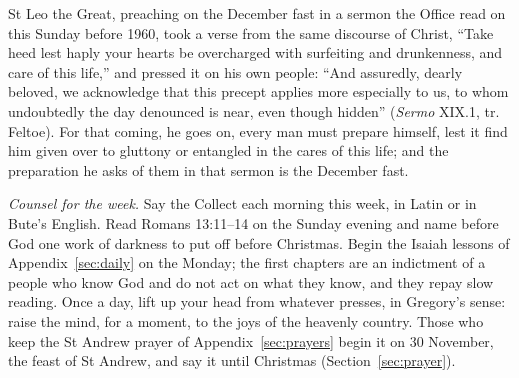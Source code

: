 St Leo the Great, preaching on the December fast in a sermon the Office read on this Sunday
before 1960, took a verse from the same discourse of Christ, ``Take heed lest haply your hearts
be overcharged with surfeiting and drunkenness, and care of this life,'' and pressed it on his
own people: ``And assuredly, dearly beloved, we acknowledge that this precept applies more
especially to us, to whom undoubtedly the day denounced is near, even though hidden''
(\textit{Sermo} XIX.1, tr. Feltoe). For that coming, he goes on, every man must prepare
himself, lest it find him given over to gluttony or entangled in the cares of this life; and the
preparation he asks of them in that sermon is the December fast.

\medskip
\noindent\textit{Counsel for the week.} Say the Collect  each morning this week, in
Latin or in Bute's English. Read Romans 13:11--14 on the Sunday evening and name before God one
work of darkness to put off before Christmas. Begin the Isaiah lessons of
Appendix~\ref{sec:daily} on the Monday; the first chapters are an indictment of a people who know
God and do not act on what they know, and they repay slow reading. Once a day, lift up your head
from whatever presses, in Gregory's sense: raise the mind, for a moment, to the joys of the
heavenly country. Those who keep the St Andrew prayer of Appendix~\ref{sec:prayers} begin it on
30 November, the feast of St Andrew, and say it until Christmas (Section~\ref{sec:prayer}).
